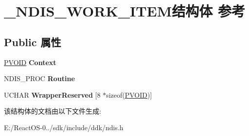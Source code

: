 \hypertarget{struct___n_d_i_s___w_o_r_k___i_t_e_m}{}\section{\+\_\+\+N\+D\+I\+S\+\_\+\+W\+O\+R\+K\+\_\+\+I\+T\+E\+M结构体 参考}
\label{struct___n_d_i_s___w_o_r_k___i_t_e_m}
\subsection*{Public 属性}
\begin{DoxyCompactItemize}
\item 
\mbox{\label{struct___n_d_i_s___w_o_r_k___i_t_e_m_a092aa34139d4cbf7d68bb218f4791616}} 
\hyperlink{interfacevoid}{P\+V\+O\+ID} {\bfseries Context}
\item 
\mbox{\label{struct___n_d_i_s___w_o_r_k___i_t_e_m_a4d6e89b6574d9c4d66f32429f18b139f}} 
N\+D\+I\+S\+\_\+\+P\+R\+OC {\bfseries Routine}
\item 
\mbox{\label{struct___n_d_i_s___w_o_r_k___i_t_e_m_aa688f2c318ca8a131e5a5bb77d57ae35}} 
U\+C\+H\+AR {\bfseries Wrapper\+Reserved} \mbox{[}8 $\ast$sizeof(\hyperlink{interfacevoid}{P\+V\+O\+ID})\mbox{]}
\end{DoxyCompactItemize}


该结构体的文档由以下文件生成\+:\begin{DoxyCompactItemize}
\item 
E\+:/\+React\+O\+S-\/0../sdk/include/ddk/ndis.\+h\end{DoxyCompactItemize}
